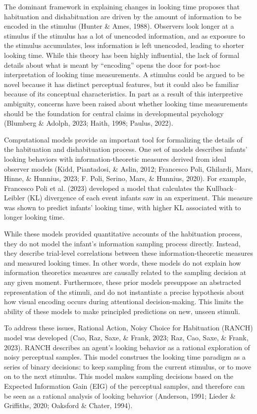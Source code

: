 \documentclass[10pt, letterpaper]{article}
\begin{document}
The dominant framework in explaining changes in looking time proposes
that habituation and dishabituation are driven by the amount of
information to be encoded in the stimulus (Hunter \& Ames, 1988).
Observers look longer at a stimulus if the stimulus has a lot of
unencoded information, and as exposure to the stimulus accumulates, less
information is left unencoded, leading to shorter looking time. While
this theory has been highly influential, the lack of formal details
about what is meant by ``encoding'' opens the door for post-hoc
interpretation of looking time measurements. A stimulus could be argued
to be novel because it has distinct perceptual features, but it could
also be familiar because of its conceptual characteristics. In part as a
result of this interpretive ambiguity, concerns have been raised about
whether looking time measurements should be the foundation for central
claims in developmental psychology (Blumberg \& Adolph, 2023; Haith,
1998; Paulus, 2022).

Computational models provide an important tool for formalizing the
details of the habituation and dishabituation process. One set of models
describes infants' looking behaviors with information-theoretic measures
derived from ideal observer models (Kidd, Piantadosi, \& Aslin, 2012;
Francesco Poli, Ghilardi, Mars, Hinne, \& Hunnius, 2023; F. Poli,
Serino, Mars, \& Hunnius, 2020). For example, Francesco Poli et al.
(2023) developed a model that calculates the Kullback--Leibler (KL)
divergence of each event infants saw in an experiment. This measure was
shown to predict infants' looking time, with higher KL associated with
to longer looking time.

While these models provided quantitative accounts of the habituation
process, they do not model the infant's information sampling process
directly. Instead, they describe trial-level correlations between these
information-theoretic measures and measured looking times. In other
words, these models do not explain how information theoretics measures
are causally related to the sampling decision at any given moment.
Furthermore, these prior models presuppose an abstracted representation
of the stimuli, and do not instantiate a precise hypothesis about how
visual encoding occurs during attentional decision-making. This limits
the ability of these models to make principled predictions on new,
unseen stimuli.

To address these issues, Rational Action, Noisy Choice for Habituation
(RANCH) model was developed (Cao, Raz, Saxe, \& Frank, 2023; Raz, Cao,
Saxe, \& Frank, 2023). RANCH describes an agent's looking behavior as a
rational exploration of noisy perceptual samples. This model construes
the looking time paradigm as a series of binary decisions: to keep
sampling from the current stimulus, or to move on to the next stimulus.
This model makes sampling decisions based on the Expected Information
Gain (EIG) of the perceptual samples, and therefore can be seen as a
rational analysis of looking behavior (Anderson, 1991; Lieder \&
Griffiths, 2020; Oaksford \& Chater, 1994).
\end{document}
